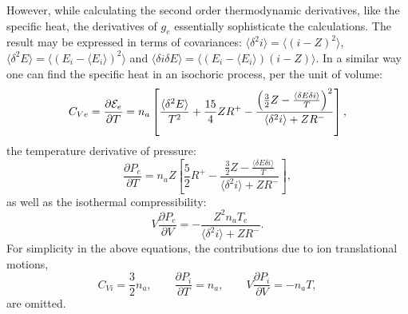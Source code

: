 However, while calculating the second order thermodynamic derivatives, like the specific heat, the derivatives of $g_e$ essentially sophisticate the 
calculations. The result may be expressed in terms of covariances: $\langle\delta^2i\rangle=\langle(i-Z)^2\rangle$, $\langle\delta^2E\rangle=\langle(E_i-\langle E_i\rangle)^2 \rangle$ and 
$\langle\delta i\delta E\rangle=\langle(E_i-\langle E_i\rangle)(i-Z)\rangle$. In a similar way one can find the specific heat in an isochoric process, per the unit of volume:
\begin{equation}
C_{Ve}=\frac{\partial {\cal E}_e}{\partial T}=n_a\left[\frac{\langle\delta^2E\rangle}{T^2}+\frac{15}4ZR^+
-\frac{\left(\frac32Z-\frac{\langle\delta E\delta i\rangle}T\right)^2}{\langle\delta^2i\rangle+ZR^-}\right],
\end{equation}
the temperature derivative of pressure:
\begin{equation}
\frac {\partial P_e}{\partial T}=n_aZ\left[\frac52 R^+ -\frac{\frac32Z-\frac{\langle\delta E\delta i\rangle}T}{\langle\delta^2i\rangle+ZR^-}\right],
\end{equation}
as well as the isothermal compressibility:
\begin{equation}
V\frac{\partial P_e}{\partial V}=-\frac{Z^2n_aT_e}{\langle\delta^2i\rangle+ZR^-}.
\end{equation}
For simplicity in the above equations, the contributions due to ion translational motions,
\begin{equation}
C_{Vi}=\frac32n_a, \qquad
\frac{\partial P_i}{\partial T}=n_a, \qquad
V\frac{\partial P_i}{\partial V}=-n_aT,
\end{equation}
are omitted.

